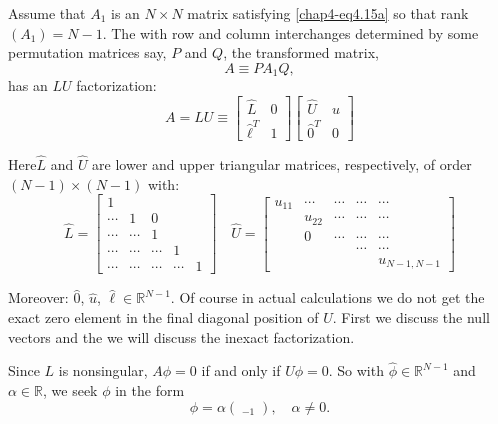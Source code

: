 Assume that  $A_1$ is an  $N \times N$ matrix satisfying
\eqref{chap4-eq4.15a} so 
that rank $(A_1)= N-1$. The with row and column interchanges
determined by some permutation matrices say, $P$ and $Q$, the
transformed matrix, 
\begin{equation*}
A \equiv PA_1Q, \tag{4.18a}\label{chap4-eq4.18a}
\end{equation*}
 has an $LU$ factorization:
 \begin{equation*}
	A= LU \equiv 
	\begin{bmatrix}
\hat{L} & 0\\
\hat{\ell}^T & 1 
	\end{bmatrix}
	\begin{bmatrix}
	\hat{U} & \hat{u}\\
	\hat{0}^T & 0
	\end{bmatrix} \tag{4.18b}\label{chap4-eq4.18b}
	\end{equation*}
	
Here\pageoriginale $\hat{L}$ and $\hat{U}$ are lower and upper
 triangular matrices, respectively, of order $(N-1)\times
 (N-1)$  with:  
$$
\hat{L}=
\begin{bmatrix}
1 & & & &  \\
\cdots & 1 & 0 & & \\
\cdots & \cdots & 1 & &\\
\cdots & \cdots & \cdots  & 1 & \\
\cdots &\cdots & \cdots & \cdots  & 1  
\end{bmatrix} \quad 
\hat{U}=
\begin{bmatrix}	
u_{11}& \cdots &\cdots & \cdots & \cdots \\
 & u_{22} & \cdots &\cdots & \cdots \\
  & 0 & \cdots & \cdots & \cdots \\
  & & & \cdots & \cdots\\
& & & & u_{N-1, N-1}
 \end{bmatrix}
 $$

Moreover: $ \hat{0}$, $\hat{u}$, $\hat{\ell} \in
\mathbb{R}^{N-1}$. Of course in actual calculations we do not get the
exact zero element in the final diagonal position of $U$. First we
discuss the null vectors and the  we will discuss the inexact
factorization.	 

Since $L$ is nonsingular, $A\phi =0 $ if and only if $U \phi =0 $. So
with $\hat{\phi} \in  \mathbb{R}^{N-1}$ and $  \alpha
\in  \mathbb{R}$, we seek $\phi $ in the form 
\begin{equation*}
\phi = \alpha \left(\displaystyle{\mathop{\hat{\phi}}_{-1}}
\right), \quad  \alpha \neq 0. \tag{4.19a}\label{chap4-eq4.19a} 
\end{equation*}

